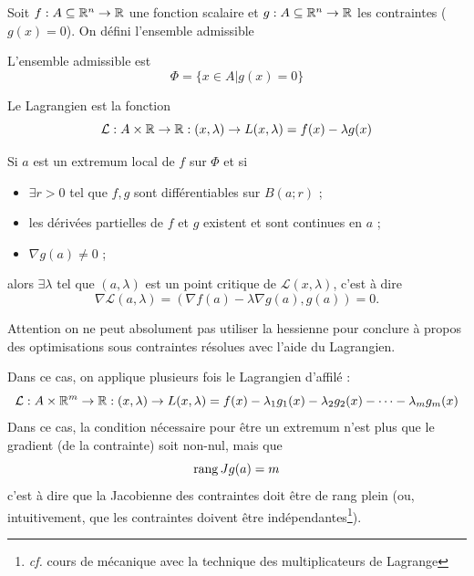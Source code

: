 Soit $f : A \subseteq \mathbb{R}^n \to \mathbb{R}$ une fonction scalaire et $g : A \subseteq \mathbb{R}^n \to \mathbb{R}$ les contraintes ($g(x) = 0$). On défini l'ensemble admissible

\begin{mydef} L'ensemble admissible est
	\[ \Phi = \{ x \in A | g(x) = 0 \} \]
\end{mydef}

\begin{mydef}[Lagrangien] Le Lagrangien est la fonction
	\[ \mathcal{L} : A \times \mathbb{R} \to \mathbb{R} : (x, \lambda) \to L(x, \lambda) = f(x) - \lambda g(x) \]
\end{mydef}

\begin{myprop}
	Si $a$ est un extremum local de $f$ sur $\Phi$ et si
	\begin{itemize}
		\item $\exists r >0$ tel que $f, g$ sont différentiables
			sur $B(a;r)$ ;
		\item les dérivées partielles de $f$ et $g$ existent et sont continues en $a$ ;
		\item $\nabla g(a) \neq 0$ ;
	\end{itemize}
	alors $\exists \lambda$ tel que $(a,\lambda)$ est un point critique de $\mathcal{L}(x,\lambda)$, c'est à dire
	\[ \nabla \mathcal{L}(a,\lambda) = (\nabla f(a) - \lambda\nabla g(a), g(a)) = 0 .\]
\end{myprop}

\begin{myrem}
	Attention on ne peut absolument pas utiliser la hessienne pour conclure à propos des optimisations sous contraintes résolues avec l'aide du Lagrangien.
\end{myrem}

\begin{myprop}
	Dans ce cas, on applique plusieurs fois le Lagrangien d'affilé :
	\[ \mathcal{L} : A \times \mathbb{R}^m \to \mathbb{R} : (x, \lambda) \to L(x, \lambda) = f(x) - \lambda_1 g_1(x) - \lambda_2 g_2(x) - \cdots - \lambda_m g_m(x) \]
	Dans ce cas, la condition nécessaire pour être un extremum n'est plus
	que le gradient (de la contrainte) soit non-nul, mais que
	\[ \operatorname{rang} Jg(a) = m \]
	c'est à dire que la Jacobienne des contraintes doit être de rang plein (ou, intuitivement, que les contraintes doivent être indépendantes\footnote{\emph{cf.} cours de mécanique avec la technique des multiplicateurs de Lagrange}).
\end{myprop}

